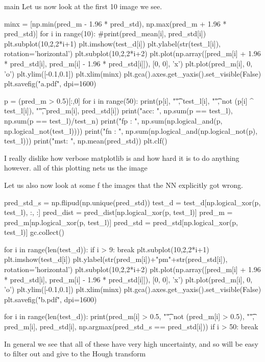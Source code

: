 \documentclass[10pt, a4paper]{article}
\begin{document}
\begin{codeblock}{main}
Let us now look at the first 10 image we see.

\begin{code}
	minx = [np.min(pred_m - 1.96 * pred_std), np.max(pred_m + 1.96 * pred_std)]
	for i in range(10):
		#print(pred_mean[i], pred_std[i])
		plt.subplot(10,2,2*i+1)
		plt.imshow(test_d[i])
		plt.ylabel(str(test_l[i]), rotation='horizontal')
		plt.subplot(10,2,2*i+2)
		plt.plot(np.array([pred_m[i] + 1.96 * pred_std[i], pred_m[i] - 1.96 * pred_std[i]]), [0, 0], 'x')
		plt.plot(pred_m[i], 0, 'o')
		plt.ylim([-0.1,0.1])
		plt.xlim(minx)
		plt.gca().axes.get_yaxis().set_visible(False)
	plt.savefig("a.pdf", dpi=1600)
	
	p = (pred_m > 0.5)[:,0]
	for i in range(50):
		print(p[i], "\t", test_l[i], "\t", not (p[i] ^ test_l[i]), "\t", pred_m[i], pred_std[i])
	print("acc: ", np.sum(p == test_l), np.sum(p == test_l)/test_n)
	print("fp : ", np.sum(np.logical_and(p, np.logical_not(test_l))))
	print("fn : ", np.sum(np.logical_and(np.logical_not(p), test_l)))
	print("mst: ", np.mean(pred_std))
	plt.clf()
\end{code}

I really dislike how verbose matplotlib is and how hard it is to do anything however. all of this plotting nets us the image 

Let us also now look at some f the images that the NN explicitly got wrong. 

\begin{code}
	pred_std_s = np.flipud(np.unique(pred_std))
	test_d = test_d[np.logical_xor(p, test_l), :, :]
	pred_dist = pred_dist[np.logical_xor(p, test_l)]
	pred_m = pred_m[np.logical_xor(p, test_l)]
	pred_std = pred_std[np.logical_xor(p, test_l)]
	gc.collect()
	
	for i in range(len(test_d)):
		if i > 9:
			break
		plt.subplot(10,2,2*i+1)
		plt.imshow(test_d[i])
		plt.ylabel(str(pred_m[i])+"pm"+str(pred_std[i]), rotation='horizontal')
		plt.subplot(10,2,2*i+2)
		plt.plot(np.array([pred_m[i] + 1.96 * pred_std[i], pred_m[i] - 1.96 * pred_std[i]]), [0, 0], 'x')
		plt.plot(pred_m[i], 0, 'o')
		plt.ylim([-0.1,0.1])
		plt.xlim(minx)
		plt.gca().axes.get_yaxis().set_visible(False)
	plt.savefig("b.pdf", dpi=1600)
	
	for i in range(len(test_d)):
		print(pred_m[i] > 0.5, "\t", not (pred_m[i] > 0.5), "\t", pred_m[i], pred_std[i], np.argmax(pred_std_s == pred_std[i]))
		if i > 50:
			break
\end{code}

In general we see that all of these have very high uncertainty, and so will be easy to filter out and give to the Hough transform


\end{codeblock}
\end{document}
